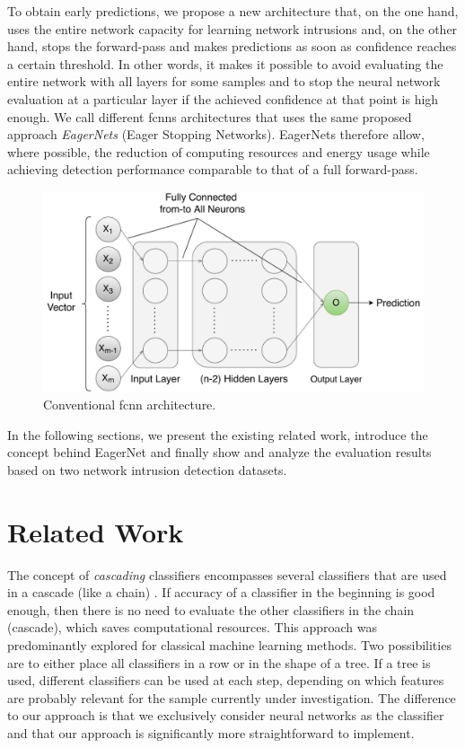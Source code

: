 \documentclass[conference]{IEEEtran}
\newcommand{\mynote}[3]{
    \fbox{\bfseries\sffamily\scriptsize#1}
    {\small$\blacktriangleright$\textsf{\emph{\color{#3}{#2}}}$\blacktriangleleft$}}
\newcommand{\todo}[1]{\mynote{TODO}{#1}{red}}
\begin{document}
To obtain early predictions, we propose a new architecture that, on the one hand, uses the entire network capacity for learning network intrusions and, on the other hand, stops the forward-pass and makes predictions as soon as confidence reaches a certain threshold. In other words, it makes it possible to avoid evaluating the entire network with all layers for some samples and to stop the neural network evaluation at a particular layer if the achieved confidence at that point is high enough. We call different \glspl{fcnn} architectures that uses the same proposed approach \emph{EagerNets} (Eager Stopping Networks). EagerNets therefore allow, where possible, the reduction of computing resources and energy usage while achieving detection performance comparable to that of a full forward-pass.

 \begin{figure}
  \includegraphics[width=\linewidth]{figures/fcnn_new1.pdf}
  \caption{Conventional \gls{fcnn} architecture.}
  \label{fig:fcnn}
\end{figure}
In the following sections, we present the existing related work, introduce the concept behind EagerNet and finally show and analyze the evaluation results based on two network intrusion detection datasets.

\section{Related Work}

The concept of \textit{cascading} classifiers encompasses several classifiers that are used in a cascade (like a chain) \cite{viola_robust_2004, xu_classifier_2014, wang_efficient_2015}. If accuracy of a classifier in the beginning is good enough, then there is no need to evaluate the other classifiers in the chain (cascade), which saves computational resources. This approach was predominantly explored for classical machine learning methods. Two possibilities are to either place all classifiers in a row or in the shape of a tree. If a tree is used, different classifiers can be used at each step, depending on which features are probably relevant for the sample currently under investigation. The difference to our approach is that we exclusively consider neural networks as the classifier and that our approach is significantly more straightforward to implement.
\end{document}
